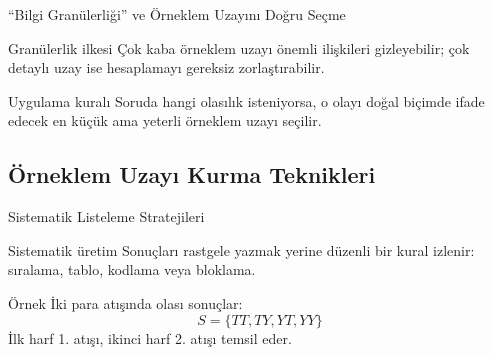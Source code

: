 \documentclass[light]{lutbeamer}
\begin{document}
\begin{frame}{``Bilgi Granülerliği'' ve Örneklem Uzayını Doğru Seçme}
    \begin{block}{Granülerlik ilkesi}
        Çok kaba örneklem uzayı önemli ilişkileri gizleyebilir; çok detaylı uzay ise
        hesaplamayı gereksiz zorlaştırabilir.
    \end{block}

    \begin{exampleblock}{Uygulama kuralı}
        Soruda hangi olasılık isteniyorsa, o olayı doğal biçimde ifade edecek en küçük
        ama yeterli örneklem uzayı seçilir.
    \end{exampleblock}
\end{frame}

\subsection{Örneklem Uzayı Kurma Teknikleri}
\begin{frame}{Sistematik Listeleme Stratejileri}
    \begin{block}{Sistematik üretim}
        Sonuçları rastgele yazmak yerine düzenli bir kural izlenir:
        sıralama, tablo, kodlama veya bloklama.
    \end{block}

    \begin{exampleblock}{Örnek}
        İki para atışında olası sonuçlar:
        \[
            S=\{TT,TY,YT,YY\}
        \]
        İlk harf 1. atışı, ikinci harf 2. atışı temsil eder.
    \end{exampleblock}
\end{frame}
\end{document}
